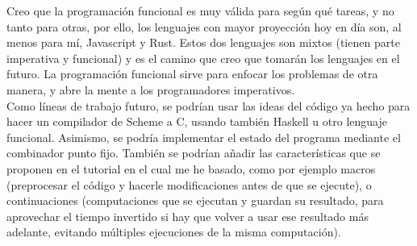 Creo que la programaci\'on funcional es muy v\'alida para seg\'un qu\'e tareas, y no tanto para otras, por ello, los lenguajes con mayor proyecci\'on hoy en d\'ia son, al menos para m\'i, Javascript y Rust. Estos dos lenguajes son mixtos (tienen parte imperativa y funcional) y es el camino que creo que tomar\'an los lenguajes en el futuro. La programaci\'on funcional sirve para enfocar los problemas de otra manera, y abre la mente a los programadores imperativos.\\

Como l\'ineas de trabajo futuro, se podr\'ian usar las ideas del c\'odigo ya hecho para hacer un compilador de Scheme a C, usando tambi\'en Haskell u otro lenguaje funcional. Asimismo, se podr\'ia implementar el estado del programa mediante el combinador punto fijo. Tambi\'en se podr\'ian a\~{n}adir las caracter\'isticas que se proponen en el tutorial en el cual me he basado, como por ejemplo macros (preprocesar el c\'odigo y hacerle modificaciones antes de que se ejecute), o continuaciones (computaciones que se ejecutan y guardan su resultado, para aprovechar el tiempo invertido si hay que volver a usar ese resultado m\'as adelante, evitando m\'ultiples ejecuciones de la misma computaci\'on).
